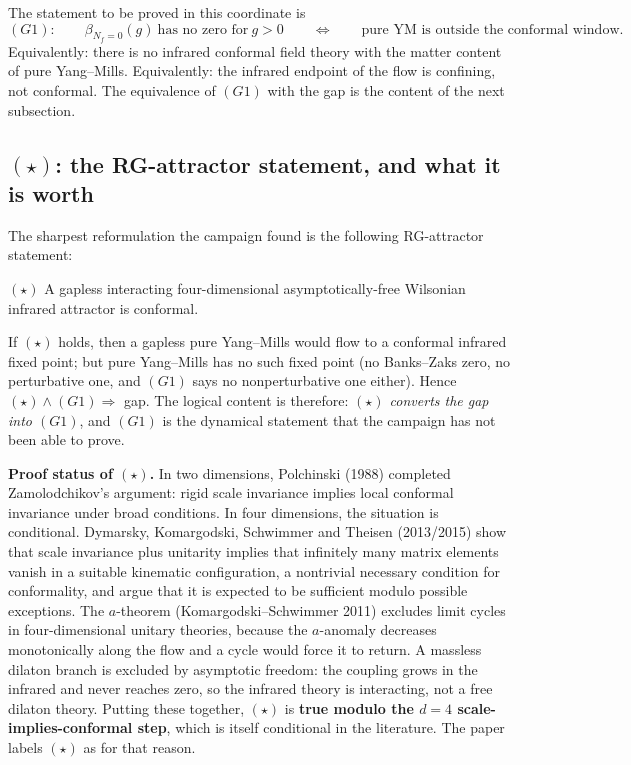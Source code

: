 The statement to be proved in this coordinate is
\begin{equation}
(G1):\qquad \beta_{N_f=0}(g)\ \text{has no zero for}\ g>0
\qquad\Longleftrightarrow\qquad
\text{pure YM is outside the conformal window.}
\label{eq:g1}
\end{equation}
Equivalently: there is no infrared conformal field theory with the matter content of pure
Yang--Mills. Equivalently: the infrared endpoint of the flow is confining, not conformal. The
equivalence of $(G1)$ with the gap is the content of the next subsection.

\figwindow

\subsection{$(\star)$: the RG-attractor statement, and what it is worth}

The sharpest reformulation the campaign found is the following RG-attractor statement:

\begin{qbox}
$(\star)$ \quad A gapless interacting four-dimensional asymptotically-free Wilsonian infrared
attractor is conformal.
\end{qbox}

If $(\star)$ holds, then a gapless pure Yang--Mills would flow to a conformal infrared fixed
point; but pure Yang--Mills has no such fixed point (no Banks--Zaks zero, no perturbative one, and
$(G1)$ says no nonperturbative one either). Hence $(\star)\wedge(G1)\Rightarrow$ gap. The logical
content is therefore: \emph{$(\star)$ converts the gap into $(G1)$}, and $(G1)$ is the dynamical
statement that the campaign has not been able to prove.

\textbf{Proof status of $(\star)$.} In two dimensions, Polchinski (1988) completed
Zamolodchikov's argument: rigid scale invariance implies local conformal invariance under broad
conditions. In four dimensions, the situation is conditional. Dymarsky, Komargodski, Schwimmer
and Theisen (2013/2015) show that scale invariance plus unitarity implies that infinitely many
matrix elements vanish in a suitable kinematic configuration, a nontrivial necessary condition
for conformality, and argue that it is expected to be sufficient modulo possible exceptions. The
$a$-theorem (Komargodski--Schwimmer 2011) excludes limit cycles in four-dimensional unitary
theories, because the $a$-anomaly decreases monotonically along the flow and a cycle would force
it to return. A massless dilaton branch is excluded by asymptotic freedom: the coupling grows in
the infrared and never reaches zero, so the infrared theory is interacting, not a free dilaton
theory. Putting these together, $(\star)$ is \textbf{true modulo the $d=4$ scale-implies-conformal
step}, which is itself conditional in the literature. The paper labels $(\star)$ as \LC{} for
that reason.

